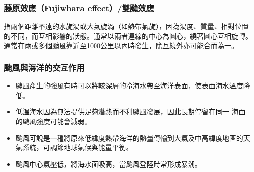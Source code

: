 \documentclass[a4paper,12pt]{report}
\begin{document}
\begin{itemize}
\subsubsection{藤原效應（Fujiwhara effect）/雙颱效應}
指兩個距離不遠的水旋渦或大氣旋渦（如熱帶氣旋），因為渦度、質量、相對位置的不同，而互相影響的狀態。通常以兩者連線的中心為圓心，繞著圓心互相旋轉。通常在兩或多個颱風靠近至1000公里以內時發生，除互繞外亦可能合而為一。
\subsubsection{颱風與海洋的交互作用}
\begin{itemize}
\item 颱風產生的強風有時可以將較深層的冷海水帶至海洋表面，使表面海水溫度降低。
\item 低溫海水因為無法提供足夠潛熱而不利颱風發展，因此長期停留在同一 海面的颱風強度可能會減弱。
\item 颱風可說是一種將原來低緯度熱帶海洋的熱量傳輸到大氣及中高緯度地區的天氣系統，可調節地球氣候與能量平衡。
\item 颱風中心氣壓低，將海水面吸高，當颱風登陸時常形成暴潮。
\end{itemize}

\end{itemize}
\end{document}
